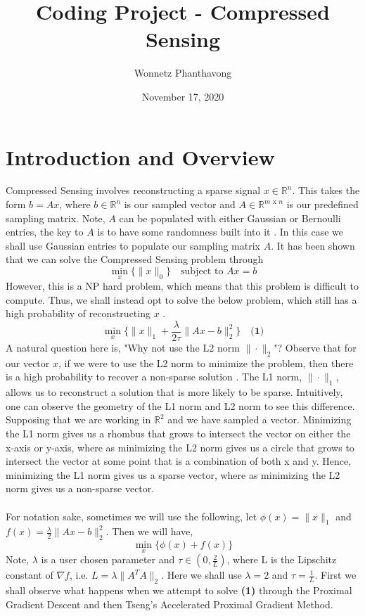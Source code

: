 \documentclass{article}
\title{Coding Project - Compressed Sensing }
\author{Wonnetz Phanthavong}
\date{November 17, 2020}
\renewcommand{\reals}{\mathbb{R}}
\begin{document}
\maketitle

\section{Introduction and Overview}
Compressed Sensing involves reconstructing a sparse signal $x \in \reals^{n}$. This takes the form $b = Ax$, where $b \in \reals^{n}$ is our sampled vector and $A \in \reals^{m\text{ x } n}$ is our predefined sampling matrix. Note, $A$ can be populated with either Gaussian or Bernoulli entries, the key to $A$ is to have some randomness built into it \cite{brunton2019data}. In this case we shall use Gaussian entries to populate our sampling matrix $A$. It has been shown that we can solve the Compressed Sensing problem through
$$
\min_{x} \{\|x\|_{0}\} \quad \text{subject to } Ax = b
$$
However, this is a NP hard problem, which means that this problem is difficult to compute. Thus, we shall instead opt to solve the  below problem, which still has a high probability of reconstructing $x$ \cite{candes2006robust}. 
$$
\min_{x} \{ \|x\|_{1} + \frac{\lambda}{2\tau}\|Ax-b\|_{2}^{2} \} \quad \textbf{(1)}
$$
A natural question here is, "Why not use the L2 norm $\|\cdot\|_{2}$"? Observe that for our vector $x$, if we were to use the L2 norm to minimize the problem, then there is a high probability to recover a non-sparse solution \cite{brunton2019data}. The L1 norm, $\|\cdot\|_{1}$, allows us to reconstruct a solution that is more likely to be sparse. Intuitively, one can observe the geometry of the L1 norm and L2 norm to see this difference. Supposing that we are working in $\reals^{2}$ and we have sampled a vector. Minimizing the L1 norm gives us a rhombus that grows to intersect the vector on either the x-axis or y-axis, where as minimizing the L2 norm gives us a circle that grows to intersect the vector at some point that is a combination of both x and y. Hence, minimizing the L1 norm gives us a sparse vector, where as minimizing the L2 norm gives us a non-sparse vector. \\
\ \\
For notation sake, sometimes we will use the following, let $\phi(x) = \|x\|_{1}$ and $f(x) = \frac{\lambda}{2}\|Ax -b\|_{2}^{2}$. Then we will have, 
$$
\min_{x} \{ \phi(x) + f(x)\}
$$
Note, $\lambda$ is a user chosen parameter and $\tau \in (0, \frac{2}{L})$, where L is the Lipschitz constant of $\nabla f$, i.e. $L = \lambda\|A^{T}A\|_{2}$. Here we shall use $\lambda = 2$ and $\tau = \frac{1}{L}$.
First we shall observe what happens when we attempt to solve \textbf{(1)} through the Proximal Gradient Descent and then Tseng's Accelerated Proximal Gradient Method. 
\end{document}
